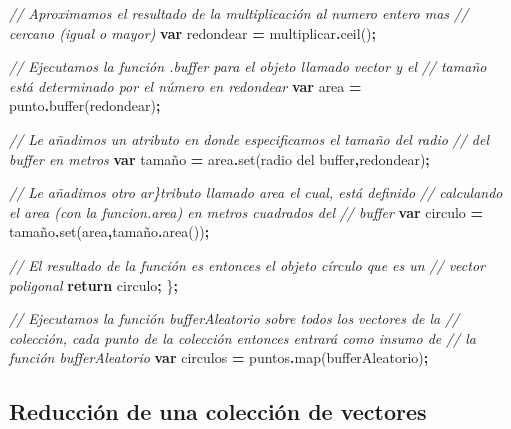 \documentclass[
  12pt,
  letterpaper,
  twoside]{book}
\newenvironment{Shaded}{\begin{snugshade}}{\end{snugshade}}
\newcommand{\CommentTok}[1]{\textcolor[rgb]{0.56,0.35,0.01}{\textit{#1}}}
\newcommand{\ControlFlowTok}[1]{\textcolor[rgb]{0.13,0.29,0.53}{\textbf{#1}}}
\newcommand{\FunctionTok}[1]{\textcolor[rgb]{0.00,0.00,0.00}{#1}}
\newcommand{\KeywordTok}[1]{\textcolor[rgb]{0.13,0.29,0.53}{\textbf{#1}}}
\newcommand{\NormalTok}[1]{#1}
\newcommand{\OperatorTok}[1]{\textcolor[rgb]{0.81,0.36,0.00}{\textbf{#1}}}
\newcommand{\StringTok}[1]{\textcolor[rgb]{0.31,0.60,0.02}{#1}}
\begin{document}
\begin{Shaded}
\begin{Highlighting}[]
  \CommentTok{// Aproximamos el resultado de la multiplicación al numero entero mas }
  \CommentTok{// cercano (igual o mayor)}
  \KeywordTok{var}\NormalTok{ redondear }\OperatorTok{=}\NormalTok{ multiplicar}\OperatorTok{.}\FunctionTok{ceil}\NormalTok{()}\OperatorTok{;} 
  
  \CommentTok{// Ejecutamos la función .buffer para el objeto llamado \textquotesingle{}vector\textquotesingle{} y el }
  \CommentTok{// tamaño está determinado por el número en \textquotesingle{}redondear\textquotesingle{}}
  \KeywordTok{var}\NormalTok{ area }\OperatorTok{=}\NormalTok{ punto}\OperatorTok{.}\FunctionTok{buffer}\NormalTok{(redondear)}\OperatorTok{;}

  \CommentTok{// Le añadimos un atributo en donde especificamos el tamaño del radio }
  \CommentTok{// del buffer en metros}
  \KeywordTok{var}\NormalTok{ tamaño }\OperatorTok{=}\NormalTok{ area}\OperatorTok{.}\FunctionTok{set}\NormalTok{(}\StringTok{\textquotesingle{}radio del buffer\textquotesingle{}}\OperatorTok{,}\NormalTok{redondear)}\OperatorTok{;}  

  \CommentTok{// Le añadimos otro ar\}tributo llamado \textquotesingle{}area\textquotesingle{} el cual, está definido }
  \CommentTok{// calculando el area (con la funcion.area) en metros cuadrados del }
  \CommentTok{// buffer }
  \KeywordTok{var}\NormalTok{ circulo }\OperatorTok{=}\NormalTok{ tamaño}\OperatorTok{.}\FunctionTok{set}\NormalTok{(}\StringTok{\textquotesingle{}area\textquotesingle{}}\OperatorTok{,}\NormalTok{tamaño}\OperatorTok{.}\FunctionTok{area}\NormalTok{())}\OperatorTok{;}  

  \CommentTok{// El resultado de la función es entonces el objeto círculo que es un }
  \CommentTok{// vector poligonal }
  \ControlFlowTok{return}\NormalTok{ circulo}\OperatorTok{;}
\NormalTok{\}}\OperatorTok{;}

\CommentTok{// Ejecutamos la función \textquotesingle{}bufferAleatorio\textquotesingle{} sobre todos los vectores de la }
\CommentTok{// colección, cada punto de la colección entonces entrará como insumo de }
\CommentTok{// la función bufferAleatorio}
\KeywordTok{var}\NormalTok{ circulos }\OperatorTok{=}\NormalTok{ puntos}\OperatorTok{.}\FunctionTok{map}\NormalTok{(bufferAleatorio)}\OperatorTok{;} 
\end{Highlighting}
\end{Shaded}

\hypertarget{reducciuxf3n-de-una-colecciuxf3n-de-vectores}{%
\subsection{Reducción de una colección de vectores}\label{reducciuxf3n-de-una-colecciuxf3n-de-vectores}}
\end{document}
